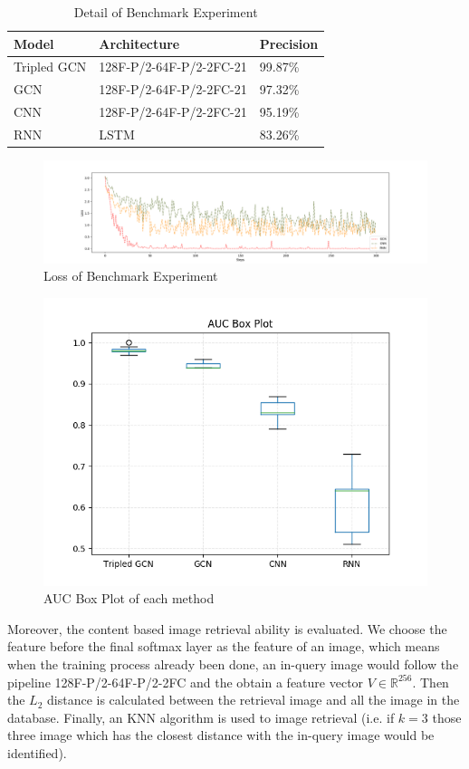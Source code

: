 \documentclass[11pt]{article}
\begin{document}
\begin{table}[!t]  \caption{Detail of Benchmark Experiment}
\centering
\label{location}
\begin{tabular}{lll}  
\toprule   
Model & Architecture & Precision\\ 
\midrule   
Tripled GCN  &128F-P/2-64F-P/2-2FC-21&99.87\%\\
GCN  &128F-P/2-64F-P/2-2FC-21&97.32\%\\
CNN  &128F-P/2-64F-P/2-2FC-21&95.19\%\\
RNN &LSTM&83.26\%\\
\bottomrule  
\end{tabular}
\end{table}
\begin{figure}[H]
	\centering
	\includegraphics[width=5.2in]{Loss}
	\caption{Loss of Benchmark Experiment}
\end{figure}
\begin{figure}[H]
	\centering
	\includegraphics[width=5.2in]{box.png}
	\caption{AUC Box Plot of each method}
\end{figure}
Moreover, the content based image retrieval ability is evaluated. We choose the feature before the final softmax layer as the feature of an image, which means when the training process already been done, an in-query image would follow the pipeline 128F-P/2-64F-P/2-2FC and the obtain a feature vector $V\in\mathbb{R}^{256}$. Then the $L_2$ distance is calculated between the retrieval image and all the image in the database. Finally, an KNN algorithm is used to image retrieval (i.e. if $k=3$ those three image which has the closest distance with the in-query image would be identified).
\end{document}
